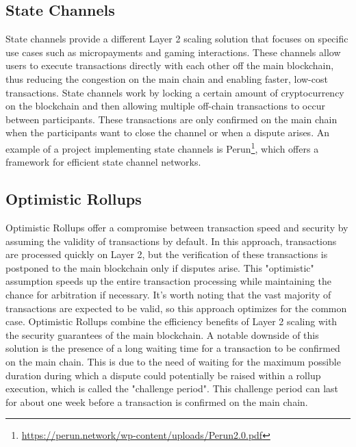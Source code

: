 \subsection{State Channels}
State channels provide a different Layer 2 scaling solution that focuses on specific use cases such as micropayments and gaming interactions. These channels allow users to execute transactions directly with each other off the main blockchain, thus reducing the congestion on the main chain and enabling faster, low-cost transactions\cite{negka_blockchain_2021}. State channels work by locking a certain amount of cryptocurrency on the blockchain and then allowing multiple off-chain transactions to occur between participants. These transactions are only confirmed on the main chain when the participants want to close the channel or when a dispute arises. An example of a project implementing state channels is Perun\footnote{\url{https://perun.network/wp-content/uploads/Perun2.0.pdf}}, which offers a framework for efficient state channel networks.

\subsection{Optimistic Rollups \label{subsec:optimisticRollups}}
Optimistic Rollups offer a compromise between transaction speed and security by assuming the validity of transactions by default\cite{thibault_blockchain_2022}. In this approach, transactions are processed quickly on Layer 2, but the verification of these transactions is postponed to the main blockchain only if disputes arise. This "optimistic" assumption speeds up the entire transaction processing while maintaining the chance for arbitration if necessary. It's worth noting that the vast majority of transactions are expected to be valid, so this approach optimizes for the common case. Optimistic Rollups combine the efficiency benefits of Layer 2 scaling with the security guarantees of the main blockchain. A notable downside of this solution is the presence of a long waiting time for a transaction to be confirmed on the main chain. This is due to the need of waiting for the maximum possible duration during which a dispute could potentially be raised within a rollup execution, which is called the "challenge period"\cite{negka_blockchain_2021}. This challenge period can last for about one week before a transaction is confirmed on the main chain.